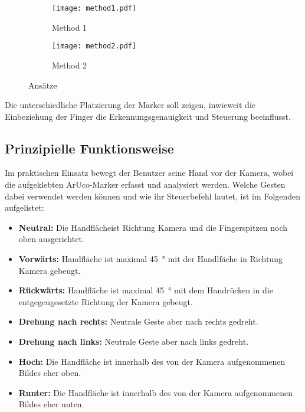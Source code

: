 \begin{figure}[H]
    \centering
    \begin{imgbox}
        \hspace{0.125\textwidth}
        \begin{subfigure}[b]{0.25\textwidth}
            \centering
            \texttt{[image: method1.pdf]}
            \caption{Method 1}
                \label{pic:m1}
        \end{subfigure}
        \hspace{0.125\textwidth}
        \vrule
        \hspace{0.125\textwidth}
        \begin{subfigure}[b]{0.25\textwidth}
            \centering
            \texttt{[image: method2.pdf]}
            \caption{Method 2}
                \label{pic:m2}
        \end{subfigure}
        \hspace{0.125\textwidth}
    \end{imgbox}
    \caption{Ansätze}
        \label{fig:methods}
\end{figure}

Die unterschiedliche Platzierung der Marker soll zeigen, inwieweit die Einbeziehung der Finger die Erkennungsgenauigkeit und Steuerung beeinflusst.

\subsection{Prinzipielle Funktionsweise}
Im praktischen Einsatz bewegt der Benutzer seine Hand vor der Kamera, wobei die aufgeklebten ArUco-Marker erfasst und analysiert werden.
Welche Gesten dabei verwendet werden können und wie ihr Steuerbefehl lautet, ist im Folgenden aufgelistet:

\begin{itemize}
    \item \textbf{Neutral:} Die Handflächeist Richtung Kamera und die Fingerspitzen noch oben ausgerichtet.
    \item \textbf{Vorwärts:} Handfläche ist maximal \SI{45}{\degree} mit der Handlfäche in Richtung Kamera gebeugt.
    \item \textbf{Rückwärts:} Handfläche ist maximal \SI{45}{\degree} mit dem Handrücken in die entgegengesetzte Richtung der Kamera gebeugt.
    \item \textbf{Drehung nach rechts:} Neutrale Geste aber nach rechts gedreht.
    \item \textbf{Drehung nach links:} Neutrale Geste aber nach links gedreht.
    \item \textbf{Hoch:} Die Handfläche ist innerhalb des von der Kamera aufgenommenen Bildes eher oben.
    \item \textbf{Runter:} Die Handfläche ist innerhalb des von der Kamera aufgenommenen Bildes eher unten.
\end{itemize}

